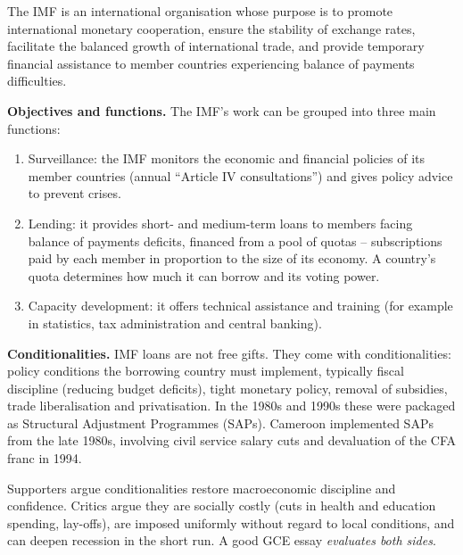 \documentclass[11pt]{article}
\newcommand{\cle}[1]{{\popxbold\color{popdark}#1}}
\begin{document}
\begin{definition}
The \cle{IMF} is an international organisation whose purpose is to promote international monetary cooperation, ensure the stability of exchange rates, facilitate the balanced growth of international trade, and provide temporary financial assistance to member countries experiencing balance of payments difficulties.
\end{definition}

\textbf{Objectives and functions.} The IMF's work can be grouped into three main functions:

\begin{enumerate}
\item \cle{Surveillance}: the IMF monitors the economic and financial policies of its member countries (annual ``Article IV consultations'') and gives policy advice to prevent crises.
\item \cle{Lending}: it provides short- and medium-term loans to members facing balance of payments deficits, financed from a pool of \cle{quotas} -- subscriptions paid by each member in proportion to the size of its economy. A country's quota determines how much it can borrow and its voting power.
\item \cle{Capacity development}: it offers technical assistance and training (for example in statistics, tax administration and central banking).
\end{enumerate}

\textbf{Conditionalities.} IMF loans are not free gifts. They come with \cle{conditionalities}: policy conditions the borrowing country must implement, typically fiscal discipline (reducing budget deficits), tight monetary policy, removal of subsidies, trade liberalisation and privatisation. In the 1980s and 1990s these were packaged as \cle{Structural Adjustment Programmes} (SAPs). Cameroon implemented SAPs from the late 1980s, involving civil service salary cuts and devaluation of the CFA franc in 1994.

\begin{attention}
Supporters argue conditionalities restore macroeconomic discipline and confidence. Critics argue they are socially costly (cuts in health and education spending, lay-offs), are imposed uniformly without regard to local conditions, and can deepen recession in the short run. A good GCE essay \emph{evaluates both sides}.
\end{attention}
\end{document}
